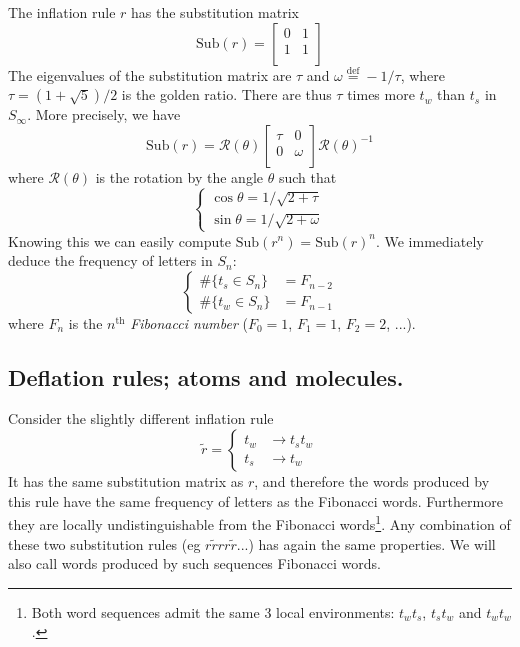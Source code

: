 \documentclass[11pt]{article}
\newcommand{\define}{\ensuremath{ \overset{\text{def}}{=} }}
\begin{document}
The inflation rule $r$ has the substitution matrix
\begin{equation}
	\text{Sub}(r) = 
	\begin{bmatrix}
	0 & 1\\
	1 & 1\\
\end{bmatrix}
\end{equation}
The eigenvalues of the substitution matrix are $\tau$ and $\omega \define -1/\tau$, where $\tau = (1+\sqrt{5})/2$ is the golden ratio.
There are thus $\tau$ times more $t_w$ than $t_s$ in $S_\infty$.
More precisely, we have 
\begin{equation}
	\text{Sub}(r) = \mathcal{R}(\theta) 
	\begin{bmatrix}
	\tau & 0\\
	0 & \omega \\
	\end{bmatrix}
	\mathcal{R}(\theta)^{-1}
\end{equation}
where $\mathcal{R}(\theta)$ is the rotation by the angle $\theta$ such that
\begin{equation}
\begin{cases}
\cos \theta = 1/\sqrt{2+\tau} \\
\sin \theta = 1/\sqrt{2+\omega}
\end{cases}
\end{equation}
Knowing this we can easily compute $\text{Sub}(r^n) = \text{Sub}(r)^n$. We immediately deduce the frequency of letters in $S_n$:
\begin{equation}
	\begin{cases}
	\#\{ t_s \in S_n \}  & = F_{n-2} \\
	\#\{ t_w \in S_n \} & = F_{n-1}
	\end{cases}
\end{equation}
where $F_n$ is the $n^\text{th}$ \emph{Fibonacci number} ($F_0 = 1$, $F_1 = 1$, $F_2 = 2$, ...).

\subsection{Deflation rules; atoms and molecules.}

Consider the slightly different inflation rule
\begin{equation}
	\tilde{r} = \begin{cases}
        t_{w} & \rightarrow t_s t_w \\
        t_s & \rightarrow t_w
      \end{cases}
\end{equation} 
It has the same substitution matrix as $r$, and therefore the words produced by this rule have the same frequency of letters as the Fibonacci words. Furthermore they are locally undistinguishable from the Fibonacci words\footnote{Both word sequences admit the same 3 local environments: $t_w t_s$, $t_s t_w$ and $t_w t_w$.}. 
Any combination of these two substitution rules (eg $r \tilde{r} r r \tilde{r}...$) has again the same properties. We will also call words produced by such sequences Fibonacci words. 
\end{document}
